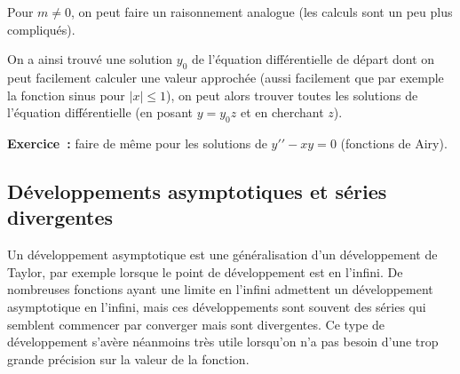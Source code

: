 \documentclass[a4paper,11pt]{article}
\begin{document}
\begin{giacjshere}
Pour $m \neq 0$, on peut faire un raisonnement analogue (les
calculs sont un peu plus compliqu\'es).

On a ainsi trouv\'e une solution $y_0$ de l'\'equation
diff\'erentielle de d\'epart dont on peut facilement calculer
une valeur approch\'ee (aussi facilement que par exemple la fonction sinus
pour $|x| \leq 1$), 
on peut alors trouver toutes les solutions de l'\'equation
diff\'erentielle (en posant $y=y_0 z$ et en cherchant $z$).

{\bf Exercice~:} faire de m\^eme pour les solutions de
$y'{'}-xy=0$ (fonctions de Airy).

\subsection{Développements asymptotiques et séries
  divergentes}
Un développement asymptotique est une généralisation d'un développement de Taylor, par exemple
lorsque le point de développement est en l'infini. De nombreuses fonctions ayant
une limite en l'infini admettent un développement asymptotique en l'infini, mais ces
développements sont souvent des séries qui semblent commencer par converger
mais sont divergentes. Ce type de développement s'avère néanmoins très utile lorsqu'on
n'a pas besoin d'une trop grande précision sur la valeur de la fonction.


\end{giacjshere}
\end{document}
